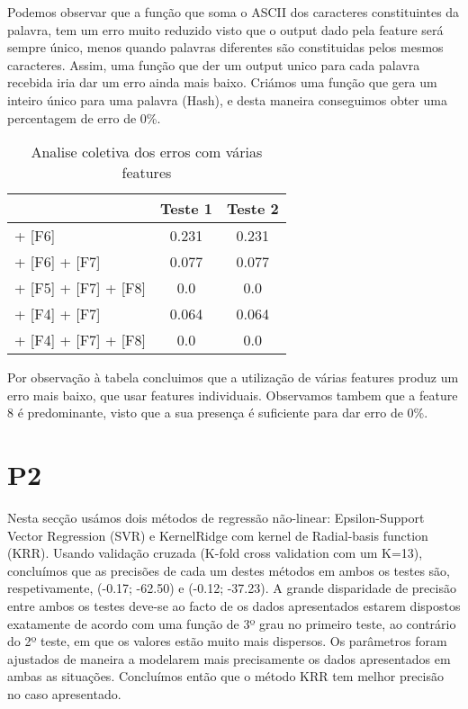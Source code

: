 \documentclass[11pt,twocolumn]{article}
\begin{document}
    Podemos observar que a função que soma o ASCII dos caracteres
    constituintes da palavra, tem um erro muito reduzido visto que o output dado pela feature será sempre único, menos quando palavras diferentes são constituidas pelos mesmos caracteres. 
    Assim, uma função que der um output unico para cada palavra recebida iria dar um erro ainda mais baixo. Criámos uma função que gera um inteiro único para uma palavra (Hash), e desta maneira conseguimos obter uma percentagem de erro de 0\%.
    
    \begin{table}[htbp]
        \centering
        \caption{Analise coletiva dos erros com várias features}
        \label{my-label}
        \begin{tabular}{|l|c|c|}
        \hline
        \multicolumn{1}{|r|}{}                                      & \textbf{Teste 1} & \textbf{Teste 2}                    \\ \hline
        [F5] + [F6] & 0.231 & 0.231 \\ \hline
        [F5] + [F6] + [F7]     & 0.077  & 0.077                   \\ \hline
        [F4] + [F5] + [F7] + [F8]   & 0.0              & 0.0                                 \\ \hline
        [F3] + [F4] + [F7]   & 0.064             & 0.064                                 \\ \hline
        [F3] + [F4] + [F7] + [F8]   & 0.0          & 0.0                                 \\ \hline
        \end{tabular}
        \end{table}
    \par  
    Por observação à tabela concluimos que a utilização de várias features produz um erro mais baixo, que usar features individuais. 
    Observamos tambem que a feature 8 é predominante, visto que a sua presença é suficiente para dar erro de 0\%.

\section*{P2}

Nesta secção usámos dois métodos de regressão não-linear: Epsilon-Support Vector Regression (SVR) e KernelRidge com kernel de Radial-basis function (KRR).
Usando validação cruzada (K-fold cross validation com um K=13), concluímos que as precisões de cada um destes métodos em ambos os testes são, respetivamente, (-0.17; -62.50) e (-0.12; -37.23).
A grande disparidade de precisão entre ambos os testes deve-se ao facto de os dados apresentados estarem dispostos exatamente de acordo com uma função de 3º grau no primeiro teste,
ao contrário do 2º teste, em que os valores estão muito mais dispersos.
Os parâmetros foram ajustados de maneira a modelarem mais precisamente os dados apresentados em ambas as situações.
Concluímos então que o método KRR tem melhor precisão no caso apresentado.
\end{document}
